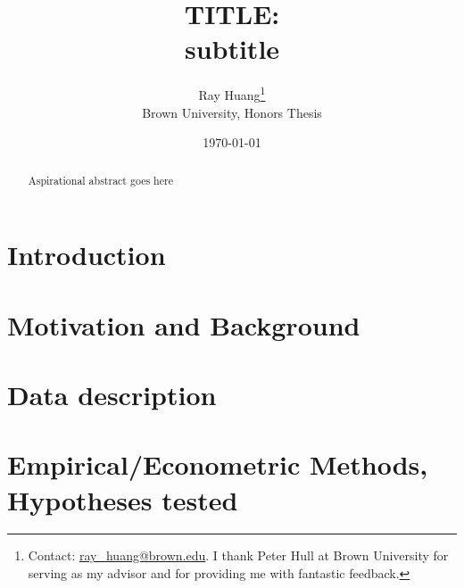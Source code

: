 \documentclass{article}
\title{TITLE:\texorpdfstring{\\}{} subtitle}
\author{Ray Huang\thanks{Contact:
    \href{mailto:ray_huang@brown.edu}{ray\_huang@brown.edu}.
     I thank Peter Hull at Brown University for serving as my advisor and for providing me with fantastic feedback.}
     \\Brown University, Honors Thesis}
\date{\today}
\begin{document}
\maketitle

\begin{abstract}
\noindent Aspirational abstract goes here
\end{abstract}

\clearpage

\section*{Introduction}

\section*{Motivation and Background}

\section*{Data description}

\section*{Empirical/Econometric Methods, Hypotheses tested}



\clearpage
\singlespacing




\clearpage
\end{document}
